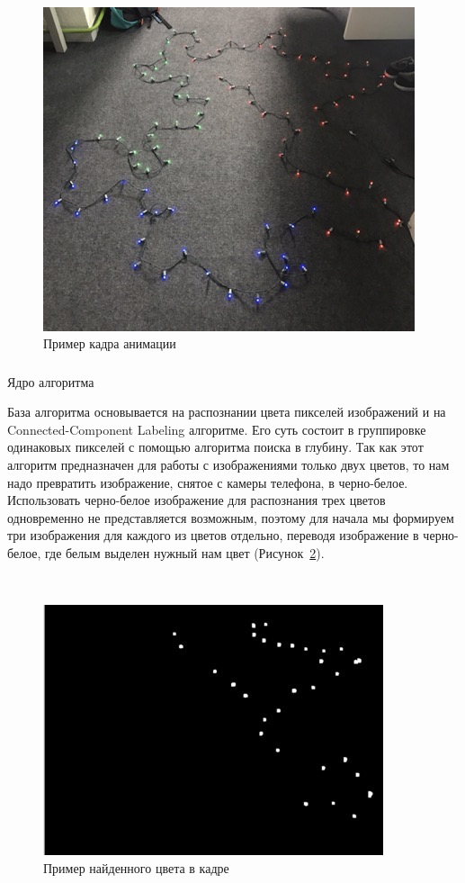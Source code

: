 ~
\begin{figure}[H]
\centering
	\includegraphics[scale=0.8]{figures/calibration_animation.jpg}
	\caption{Пример кадра анимации}
	\label{fig:develop:algorithm:animation}
\end{figure}

\subsubsection{} Ядро алгоритма
\label{sec:develop:algorithm:core}

База алгоритма основывается на распознании цвета пикселей изображений и на Connected-Component Labeling алгоритме. Его суть состоит в группировке одинаковых пикселей с помощью алгоритма поиска в глубину. Так как этот алгоритм предназначен для работы с изображениями только двух цветов, то нам надо превратить изображение, снятое с камеры телефона, в черно-белое. Использовать черно-белое изображение для распознания трех цветов одновременно не представляется возможным, поэтому для начала мы формируем три изображения для каждого из цветов отдельно, переводя изображение в черно-белое, где белым выделен нужный нам цвет (Рисунок~\ref{fig:develop:algorithm:colorFinding}).

~
\begin{figure}[H]
\centering
	\includegraphics[scale=0.8]{figures/calibration_findedColor.jpg}
	\caption{Пример найденного цвета в кадре}
	\label{fig:develop:algorithm:colorFinding}
\end{figure}

